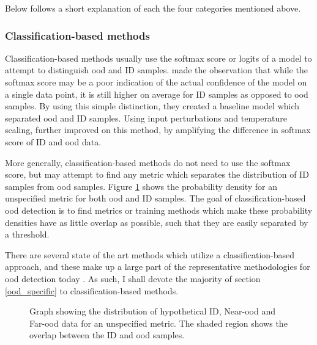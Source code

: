 \documentclass[UKenglish]{uiomasterthesis} %
\theoremstyle{definition}
\begin{document}
Below follows a short explanation of each the four categories mentioned above.
\\

\subsubsection{Classification-based methods}

Classification-based methods usually use the softmax score or logits of a model to attempt to distinguish \ac{ood} and ID samples. \cite{oodbaseline} made the observation that while the softmax score may be a poor indication of the actual confidence of the model on a single data point, it is still higher on average for ID samples as opposed to \ac{ood} samples. By using this simple distinction, they created a baseline model which separated \ac{ood} and ID samples. Using input perturbations and temperature scaling, \cite{odin} further improved on this method, by amplifying the difference in softmax score of ID and \ac{ood} data. 

More generally, classification-based methods do not need to use the softmax score, but may attempt to find any metric which separates the distribution of ID samples from \ac{ood} samples. Figure \ref{fig:ood_metric} shows the probability density for an unspecified metric for both \ac{ood} and ID samples. The goal of classification-based \ac{ood} detection is to find metrics or training methods which make these probability densities have as little overlap as possible, such that they are easily separated by a threshold.

There are several state of the art methods which utilize a classification-based approach, and these make up a large part of the representative methodologies for \ac{ood} detection today \cite[8]{oodoverview}. As such, I shall devote the majority of section \ref{ood_specific} to classification-based methods.

\begin{figure}
    \label{fig:ood_metric}
    \begin{center}
        
    \end{center}
    \caption[Hypothetical ID/\ac{ood} distributions for an \ac{ood} detection metric]{Graph showing the distribution of hypothetical ID, Near-\ac{ood} and Far-\ac{ood} data for an unspecified metric. The shaded region shows the overlap between the ID and \ac{ood} samples.}
\end{figure}
\end{document}
